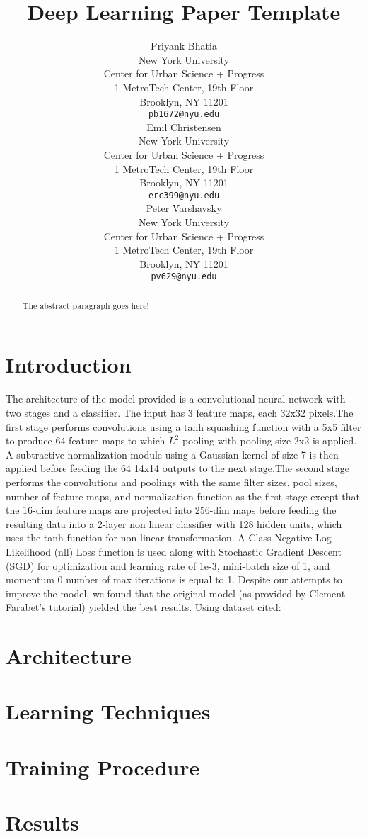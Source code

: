 \documentclass{article} %
\title{Deep Learning Paper Template}
\author{
Priyank Bhatia \\
New York University \\
Center for Urban Science + Progress \\
1 MetroTech Center, 19th Floor \\
Brooklyn, NY 11201 \\
\texttt{pb1672@nyu.edu} \\
\AND
Emil Christensen \\
New York University \\
Center for Urban Science + Progress \\
1 MetroTech Center, 19th Floor \\
Brooklyn, NY 11201 \\
\texttt{erc399@nyu.edu} \\
\And
Peter Varshavsky \\
New York University \\
Center for Urban Science + Progress \\
1 MetroTech Center, 19th Floor \\
Brooklyn, NY 11201 \\
\texttt{pv629@nyu.edu} \\
}
\begin{document}
\maketitle


\begin{abstract}
The abstract paragraph goes here!
\end{abstract}

\section{Introduction}
\label{intro}
The architecture of the model provided is a convolutional neural network with two stages and a classifier. The input has 3 feature maps, each 32x32 pixels.The first stage performs convolutions using a tanh squashing function with a 5x5 filter to produce 64 feature maps to which $L^2$ pooling with pooling size 2x2 is applied. A subtractive normalization module using a Gaussian kernel of size 7 is then applied before feeding the 64 14x14 outputs to the next stage.The second stage performs the convolutions and poolings with the same filter sizes, pool sizes, number of feature maps, and normalization function as the first stage except that the 16-dim feature maps are projected into 256-dim maps before feeding the resulting data into a 2-layer non linear classifier with 128 hidden units, which uses the tanh function for non linear transformation. A Class Negative Log-Likelihood (nll) Loss function is used along with Stochastic Gradient Descent (SGD) for optimization and learning rate of 1e-3, mini-batch size of 1, and momentum 0 number of max iterations is equal to 1. Despite our attempts to improve the model, we found that the original model (as provided by Clement Farabet’s tutorial) yielded the best results.
Using dataset cited: ~\cite{37648}

\section{Architecture}
\label{arc}

\section{Learning Techniques}
\label{learn}

\section{Training Procedure}
\label{train}

\section{Results}
\label{res}


{}

\end{document}
